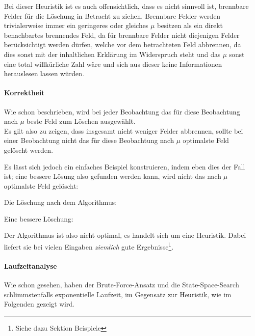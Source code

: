 Bei dieser Heuristik ist es auch offensichtlich, dass es nicht sinnvoll ist, brennbare Felder für die Löschung in Betracht zu ziehen. Brennbare Felder werden trivialerweise immer ein geringeres oder gleiches $\mu$ besitzen als ein direkt benachbartes brennendes Feld, da für brennbare Felder nicht diejenigen Felder berücksichtigt werden dürfen, welche vor dem betrachteten Feld abbrennen, da dies sonst mit der inhaltlichen Erklärung im Widerspruch steht und das $\mu$ sonst eine total willkürliche Zahl wäre und sich aus dieser keine Informationen herauslesen lassen würden.

\paragraph{Korrektheit}
Wie schon beschrieben, wird bei jeder Beobachtung das für diese Beobachtung nach $\mu$ beste Feld zum Löschen ausgewählt.\\
Es gilt also zu zeigen, dass insgesamt nicht weniger Felder abbrennen, sollte bei einer Beobachtung nicht das für diese Beobachtung nach $\mu$ optimalste Feld gelöscht werden. 

Es lässt sich jedoch ein einfaches Beispiel konstruieren, indem eben dies der Fall ist; eine bessere Lösung also gefunden werden kann, wird nicht das nach $\mu$ optimalste Feld gelöscht:

\begin{multicols}{2}
Die Löschung nach dem Algorithmus:
{\ttfamily \small

}

Eine bessere Löschung:
{\ttfamily \small

}
\end{multicols}

Der Algorithmus ist also nicht optimal, es handelt sich um eine Heuristik. Dabei liefert sie bei vielen Eingaben \emph{ziemlich} gute Ergebnisse\footnote{Siehe dazu Sektion Beispiele}.

\paragraph{Laufzeitanalyse}
Wie schon gesehen, haben der Brute-Force-Ansatz und die State-Space-Search schlimmstenfalls exponentielle Laufzeit, im Gegensatz zur Heuristik, wie im Folgenden gezeigt wird.

